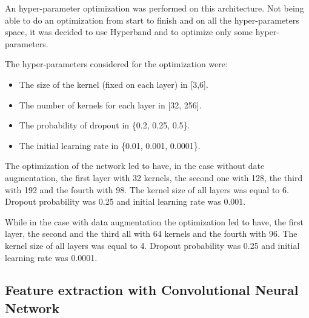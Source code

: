 An hyper-parameter optimization was performed on this architecture.
Not being able to do an optimization from start to finish and on all the hyper-parameters space,
it was decided to use Hyperband \cite{li2016novel} and to optimize only some hyper-parameters.

The hyper-parameters considered for the optimization were:
\begin{itemize}
    \item The size of the kernel (fixed on each layer) in [3,6].
    \item The number of kernels for each layer in [32, 256].
    \item The probability of dropout in \{0.2, 0.25, 0.5\}.
    \item The initial learning rate in \{0.01, 0.001, 0.0001\}.
\end{itemize}

The optimization of the network led to have, in the case without date augmentation, the first layer with 32 kernels, the second one with 128, the third with 192 and the fourth with 98. The kernel size of all layers was equal to 6.
Dropout probability was 0.25 and initial learning rate was 0.001.

While in the case with data augmentation the optimization led to have, the first layer, the second and the third all with 64 kernels and the fourth with 96.
The kernel size of all layers was equal to 4. Dropout probability was 0.25 and initial learning rate was 0.0001.

\subsection{Feature extraction with Convolutional Neural Network}

